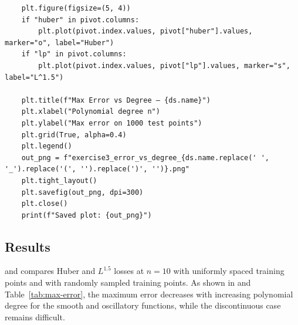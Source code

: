 \documentclass[a4paper,12pt]{article}
\begin{document}
\begin{lstlisting}
    plt.figure(figsize=(5, 4))
    if "huber" in pivot.columns:
        plt.plot(pivot.index.values, pivot["huber"].values, marker="o", label="Huber")
    if "lp" in pivot.columns:
        plt.plot(pivot.index.values, pivot["lp"].values, marker="s", label="L^1.5")

    plt.title(f"Max Error vs Degree — {ds.name}")
    plt.xlabel("Polynomial degree n")
    plt.ylabel("Max error on 1000 test points")
    plt.grid(True, alpha=0.4)
    plt.legend()
    out_png = f"exercise3_error_vs_degree_{ds.name.replace(' ', '_').replace('(', '').replace(')', '')}.png"
    plt.tight_layout()
    plt.savefig(out_png, dpi=300)
    plt.close()
    print(f"Saved plot: {out_png}")
\end{lstlisting}


\subsection*{Results}
 and  compares Huber and $L^{1.5}$ losses at $n=10$ with uniformly spaced training points and with randomly sampled training points. As shown in  and Table~\ref{tab:max-error}, the maximum error decreases with increasing polynomial degree for the smooth and oscillatory functions, while the discontinuous case remains difficult.
\end{document}
